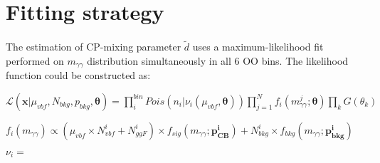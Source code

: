 \section{Fitting strategy}
\label{sec:fit}
\paragraph{} The estimation of CP-mixing parameter $\tilde{d}$ uses a maximum-likelihood fit performed on $m_{\gamma\gamma}$ distribution simultaneously in all 6 OO bins. The likelihood function could be constructed as:

\begin{center}
\begin{math}
\mathcal{L}(\boldsymbol{x} |\mu_{vbf},N_{bkg},p_{bkg},\boldsymbol{\theta}) = \prod_{i}^{bin}Pois(n_{i}|\nu_{i}(\mu_{vbf},\boldsymbol{\theta}))\prod_{j=1}^{N}f_{i}(m_{\gamma\gamma}^{j};\boldsymbol{\theta})\prod_{k}G(\theta_{k})
\end{math}
\end{center}

\begin{center}
	\begin{math}
	f_{i}(m_{\gamma\gamma})\propto(\mu_{vbf} \times N_{vbf}^{i} + N_{ggF}^{i})\times f_{sig}(m_{\gamma\gamma};\boldsymbol{p_{CB}^{i}})+N_{bkg}^{i}\times f_{bkg}(m_{\gamma\gamma};\boldsymbol{p_{bkg}^{i}})
	\end{math}
\end{center}

\begin{center}
\begin{math}
\nu_{i}=
\end{math}
\end{center}

